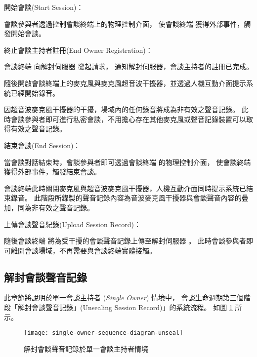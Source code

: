\begin{steps}
    \item 開始會談(Start Session)：

            會談參與者透過控制會談終端上的物理控制介面，
        使會談終端 \DEFmeetingbox 獲得外部事件，觸發開始會談。

    \item 終止會談主持者註冊(End Owner Registration)：

            會談終端 \DEFmeetingbox 向解封伺服器 \DEFserver 發起請求，
        通知解封伺服器，會談主持者的註冊已完成。

            隨後開啟會談終端上的麥克風與麥克風超音波干擾器，並透過人機互動介面提示系統已經開始錄音。

            因超音波麥克風干擾器的干擾，場域內的任何錄音將成為非有效之聲音記錄。
        此時會談參與者即可進行私密會談，不用擔心存在其他麥克風或聲音記錄裝置可以取得有效之聲音記錄。

    \item 結束會談(End Session)：

            當會談對話結束時，會談參與者即可透過會談終端 \DEFmeetingbox 的物理控制介面，
        使會談終端獲得外部事件，觸發結束會談。

            會談終端此時關閉麥克風與超音波麥克風干擾器，人機互動介面同時提示系統已結束錄音。
        此階段所錄製的聲音記錄內容為音波麥克風干擾器與會談聲音內容的疊加，同為非有效之聲音記錄。

    \item 上傳會談聲音紀錄(Upload Session Record)：

            隨後會談終端 \DEFmeetingbox 將為受干擾的會談聲音記錄上傳至解封伺服器 \DEFserver。
        此時會談參與者即可離開會談場域，不再需要與會談終端實體接觸。
\end{steps}


\subsection{解封會談聲音記錄}\label{subsec:unseal}

    此章節將說明於單一會談主持者 ({\it Single Owner}) 情境中，
會談生命週期第三個階段「解封會談聲音記錄」(Unsealing Session Record)」的系統流程。
如圖 \ref{fig:s-o-unseal} 所示。

\begin{figure}[H]
    \centering
    \texttt{[image: single-owner-sequence-diagram-unseal]}
    \caption{解封會談聲音記錄於單一會談主持者情境}\label{fig:s-o-unseal}
\end{figure}

